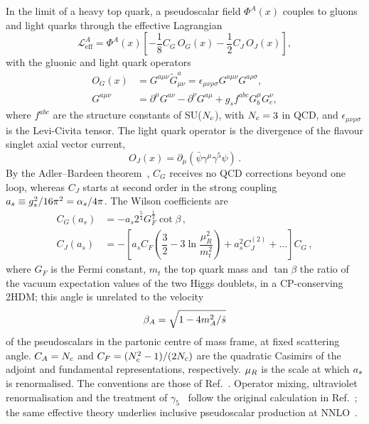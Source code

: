 In the limit of a heavy top quark, a pseudoscalar field
$\Phi^A(x)$ couples to gluons and light quarks through the
effective Lagrangian~\cite{Chetyrkin:1998mw}
\begin{equation}
 \mathcal L^A_{\mathrm{eff}}=\Phi^A(x)\left[
 -\frac{1}{8}C_G\,O_G(x)-\frac{1}{2}C_J\,O_J(x)\right],
 \label{eq:EL}
\end{equation}
with the gluonic and light quark operators
\begin{align}
O_G(x)&=G^{a\mu\nu}\tilde{G}_{\mu\nu}^a=\epsilon_{\mu\nu\rho\sigma}
G^{a\mu\nu}G^{a\rho\sigma},
\\
G^{a\mu\nu}&=\partial^{\mu}G^{a\nu}-\partial^{\nu}G^{a\mu}+g_s f^{abc}
G_{b}^{\mu}G_{c}^{\nu},
\end{align}
where $f^{abc}$ are the structure constants of SU($N_c$), with $N_c=3$ in QCD, and
$\epsilon_{\mu\nu\rho\sigma}$ is the Levi-Civita tensor. The
light quark operator is the divergence of the flavour singlet
axial vector current,
\begin{equation}
O_{J}(x)=\partial_{\mu}\left(\bar{\psi}\gamma^{\mu}\gamma^{5}\psi\right) \,.
\label{eq:Fields EL}
\end{equation}
By the Adler--Bardeen theorem~\cite{Adler:1969gk,AdlerBardeen1969}, $C_G$ receives
no QCD corrections beyond one loop, whereas $C_J$ starts at second
order in the strong coupling $a_s\equiv g_s^2/16\pi^2=\alpha_s/4\pi$.
The Wilson coefficients are
\begin{align}
C_{G}\left(a_{s}\right) & =-a_{s}2^{\tfrac{5}{4}}G_{F}^{\tfrac{1}{2}}\cot\beta \,,
\label{WCG}
\\
C_{J}\left(a_{s}\right) & =-\left[a_{s}C_{F}\left(\dfrac{3}{2}-3\ln\dfrac{\mu_{R}^{2}}{m_{t}^{2}}\right)
+a_{s}^{2}C_{J}^{\left(2\right)}+...\right]C_{G}\,,
\label{WCJ}
\end{align}
where $G_F$ is the Fermi constant, $m_t$ the top quark mass and
$\tan\beta$ the ratio of the vacuum expectation values of the two
Higgs doublets, in a CP-conserving 2HDM; this
angle is unrelated to the velocity
\begin{equation}
 \beta_A=\sqrt{1-4m_A^2/\hat s}
 \label{eq:beta_def}
\end{equation}
of the pseudoscalars in the partonic centre of mass frame, at fixed scattering angle.
$C_A=N_c$ and $C_F=(N_c^2-1)/(2N_c)$ are the quadratic Casimirs of the adjoint and fundamental representations, respectively.
$\mu_R$ is the scale at which $a_s$ is renormalised. The conventions are those of Ref.~\cite{Bhattacharya:2019bmd}. Operator mixing, ultraviolet renormalisation and the treatment of $\gamma_5$~\cite{Larin1993} follow the original calculation in Ref.~\cite{Bhattacharya:2019bmd}; the same effective theory underlies inclusive pseudoscalar production at NNLO~\cite{HarlanderKilgore2002}.

